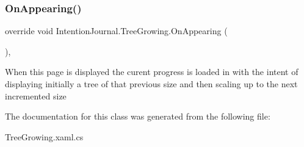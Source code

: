 \subsubsection{\texorpdfstring{On\+Appearing()}{OnAppearing()}}
{\footnotesize\ttfamily override void Intention\+Journal.\+Tree\+Growing.\+On\+Appearing (\begin{DoxyParamCaption}{ }\end{DoxyParamCaption})\hspace{0.3cm}{\ttfamily [inline]}, {\ttfamily [protected]}}



When this page is displayed the curent progress is loaded in with the intent of displaying initially a tree of that previous size and then scaling up to the next incremented size 



The documentation for this class was generated from the following file\+:\begin{DoxyCompactItemize}
\item 
Tree\+Growing.\+xaml.\+cs\end{DoxyCompactItemize}
